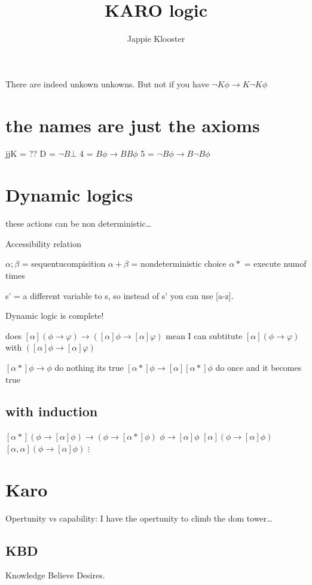 \documentclass{article}
\begin{document}
\author{Jappie Klooster}
\title{KARO logic}
\maketitle

There are indeed unkown unkowns. But not if you have
$\neg K \phi \to K \neg K \phi$

\section{the names are just the axioms}
jjK = ??
D = $\neg B \bot$
4 = $B\phi \to BB \phi$
5 = $\neg B \phi \to B\neg B \phi$

\section{Dynamic logics}
these actions can be non deterministic\ldots

Accessibility relation

$\alpha;\beta$ = sequentu\alphal compisition
$\alpha+\beta$ = nondeterministic choice
$\alpha*$ = execute \alphar\betaitr\alphary num\betaer of times

s' = a different variable to s, so instead of s' you can use [a-z].

Dynamic logic is complete!

does $[\alpha] ( \phi \to \varphi) \to ([\alpha] \phi \to [\alpha] \varphi)$
mean I can subtitute  $[\alpha] ( \phi \to \varphi)$ with
$([\alpha] \phi \to [\alpha] \varphi)$

$[\alpha*]\phi\to\phi$ do nothing its true
$[\alpha*]\phi\to[\alpha][\alpha*]\phi$ do once and it becomes true
\subsection{with induction}
$[\alpha*](\phi \to [\alpha]\phi)\to(\phi\to[\alpha*]\phi)$ 
$\phi\to[\alpha]\phi$
$[\alpha](\phi\to[\alpha]\phi)$
$[\alpha, \alpha](\phi\to[\alpha]\phi)$
$\vdots$

\section{Karo}
Opertunity vs capability: I have the opertunity to climb the dom tower\ldots

\subsection{KBD}
Knowledge Believe Desires.
\end{document}
